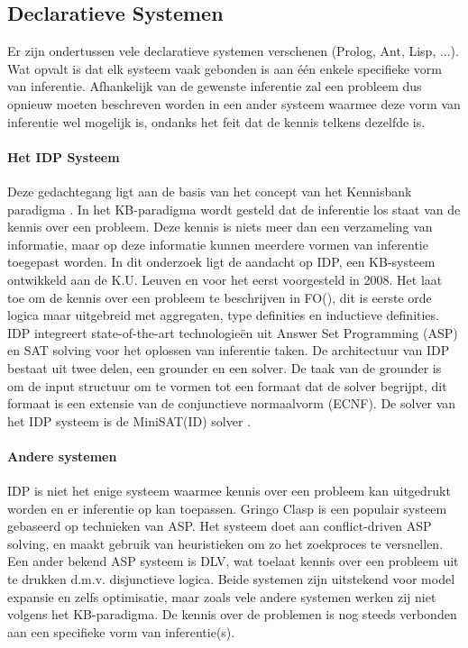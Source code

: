 \subsection{Declaratieve Systemen}
Er zijn ondertussen vele declaratieve systemen verschenen (Prolog, Ant, Lisp, ...). Wat opvalt is dat elk systeem vaak gebonden is aan \'{e}\'{e}n enkele specifieke vorm van inferentie. Afhankelijk van de gewenste inferentie zal een probleem dus opnieuw moeten beschreven worden in een ander systeem waarmee deze vorm van inferentie wel mogelijk is, ondanks het feit dat de kennis telkens dezelfde is. 

\paragraph{Het IDP Systeem}
Deze gedachtegang ligt aan de basis van het concept van het Kennisbank paradigma \citep{denecker2008building}. In het KB-paradigma wordt gesteld dat de inferentie los staat van de kennis over een probleem. Deze kennis is niets meer dan een verzameling van informatie, maar op deze informatie kunnen meerdere vormen van inferentie toegepast worden. In dit onderzoek ligt de aandacht op IDP, een KB-systeem ontwikkeld aan de K.U. Leuven en voor het eerst voorgesteld in 2008. Het laat toe om de kennis over een probleem te beschrijven in FO(\textperiodcentered), dit is eerste orde logica maar uitgebreid met aggregaten, type definities en inductieve definities. IDP integreert state-of-the-art technologie\"{e}n uit Answer Set Programming (ASP) en SAT solving voor het oplossen van inferentie taken. De architectuur van IDP bestaat uit twee delen, een grounder en een solver. De taak van de grounder is om de input structuur om te vormen tot een formaat dat de solver begrijpt, dit formaat is een extensie van de conjunctieve normaalvorm (ECNF). De solver van het IDP systeem is de MiniSAT(ID) solver \citep{de2014minisat}.

\paragraph{Andere systemen}
IDP is niet het enige systeem waarmee kennis over een probleem kan uitgedrukt worden en er inferentie op kan toepassen. Gringo Clasp \citep{gebser2007clasp} is een populair systeem gebaseerd op technieken van ASP. Het systeem doet aan conflict-driven ASP solving, en maakt gebruik van heuristieken om zo het zoekproces te versnellen. Een ander bekend ASP systeem is DLV, wat toelaat kennis over een probleem uit te drukken d.m.v. disjunctieve logica. Beide systemen zijn uitstekend voor model expansie en zelfs optimisatie, maar zoals vele andere systemen werken zij niet volgens het KB-paradigma. De kennis over de problemen is nog steeds verbonden aan een specifieke vorm van inferentie(s). 

